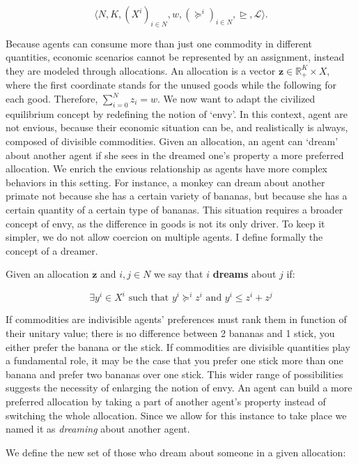 \[\langle N,K,(X^i)_{i\in N}, w, (\succeq^i)_{i\in N}, \trianglerighteq, \mathcal{L}\rangle.\]

Because agents can consume more than just one commodity in different quantities, economic scenarios cannot be represented by an assignment, instead they are modeled through allocations. An allocation is a vector $\textbf{z}\in \mathbb{R}_+^K\times X$, where the first coordinate stands for the unused goods while the following for each good. Therefore, $\sum_{i=0}^Nz_i=w$. We now want to adapt the civilized equilibrium concept by redefining the notion of `envy'. In this context, agent are not envious, because their economic situation can be, and realistically is always, composed of divisible commodities. Given an allocation, an agent can `dream' about another agent if she sees in the dreamed one's property a more preferred allocation. We enrich the envious relationship as agents have more complex behaviors in this setting. For instance, a monkey can dream about another primate not because she has a certain variety of bananas, but because she has a certain quantity of a certain type of bananas. This situation requires a broader concept of envy, as the difference in goods is not its only driver. To keep it simpler, we do not allow coercion on multiple agents. I define formally the concept of a dreamer.

\begin{definition}
    Given an allocation $\textbf{z}$ and $i,j\in N$ we say that $i$ \textbf{dreams} about $j$ if:

\[\exists y^i\in X^i \text{ such that } y^i\succeq^iz^i \text{ and } y^i\leq z^i+z^j\]
\end{definition}

If commodities are indivisible agents' preferences must rank them in function of their unitary value; there is no difference between 2 bananas and 1 stick, you either prefer the banana or the stick. If commodities are divisible quantities play a fundamental role, it may be the case that you prefer one stick more than one banana and prefer two bananas over one stick. This wider range of possibilities suggests the necessity of enlarging the notion of envy. An agent can build a more preferred allocation by taking a part of another agent's property instead of switching the whole allocation. Since we allow for this instance to take place we named it as \textit{dreaming} about another agent.

We define the new set of those who dream about someone in a given allocation:

